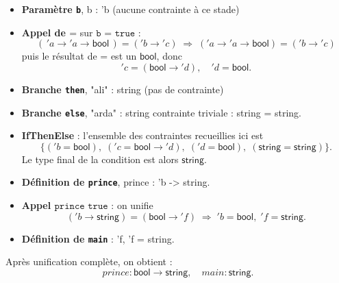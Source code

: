 \begin{itemize}
    \item \textbf{Paramètre \texttt{b}}, b : 'b (aucune contrainte à ce stade)

    \item \textbf{Appel de \(\texttt{=}\)} sur \(\texttt{b = true}\) :
          \[
              (\,'a \to 'a \to \mathsf{bool}\,) = ('b \to 'c)
              \;\Longrightarrow\;
              \boxed{('a \to 'a \to \mathsf{bool}) = ('b \to 'c)}
          \]
          puis le résultat de \(\texttt{=}\) est un \(\mathsf{bool}\), donc
          \[
              'c = (\mathsf{bool} \to 'd),
              \quad
              'd = \mathsf{bool}.
          \]

    \item \textbf{Branche \texttt{then}}, "ali" : string (pas de contrainte)

    \item \textbf{Branche \texttt{else}}, "arda" : string contrainte triviale : string = string.

    \item \textbf{IfThenElse} :
          l’ensemble des contraintes recueillies ici est
          \[
              \{ ('b = \mathsf{bool}),\;('c = \mathsf{bool}\to 'd),\;('d = \mathsf{bool}),\;(\mathsf{string} = \mathsf{string})\}.
          \]
          Le type final de la condition est alors \(\mathsf{string}\).

    \item \textbf{Définition de \texttt{prince}}, prince : 'b -> string.

    \item \textbf{Appel \(\texttt{prince true}\)} :
          on unifie
          \[
              ('b \to \mathsf{string}) = (\mathsf{bool} \to 'f)
              \;\Longrightarrow\;
              'b = \mathsf{bool},\; 'f = \mathsf{string}.
          \]

    \item \textbf{Définition de \texttt{main}} : 'f, 'f = string.
\end{itemize}

Après unification complète, on obtient :
\[
    prince : \mathsf{bool} \to \mathsf{string},
    \quad
    main   : \mathsf{string}.
\]

